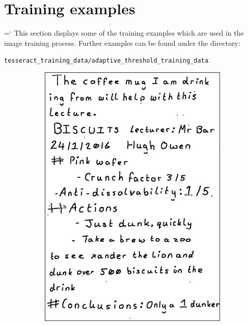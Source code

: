 \section{Training examples} \label{tesseract:training}
{{\ttfamily \hyphenchar\the\font=`\-}%
This section displays some of the training examples which are used in the image training process. Further examples can be found under the directory:

\noindent
\texttt{tesseract\_training\_data/adaptive\_threshold\_training\_data}.

\begin{figure}[H]
  \centering
  \begin{subfigure}[h]{0.35\textwidth}
    \includegraphics[scale=0.1]{images/training_data_1}
    \caption{}
    \label{fig:first_tesseract}
  \end{subfigure}
  \hspace{4em}

\end{figure}}

